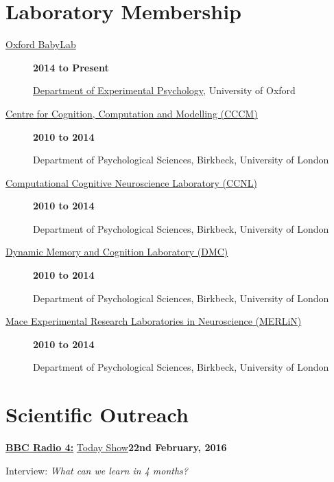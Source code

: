 \section{Laboratory Membership}
\begin{description}

\item[\href{http://www.psy.ox.ac.uk/research/oxford-babylab}{Oxford BabyLab}]
      \hfill \textbf{2014 to Present}\blankline

\href{http://www.psy.ox.ac.uk/}{Department of Experimental Psychology}, University of Oxford

\item[\href{http://cccm.bbk.ac.uk/}{Centre for Cognition, Computation and Modelling (CCCM)}] 
\blankline

\hfill \textbf{2010 to 2014}\blankline

Department of Psychological Sciences, Birkbeck, University of London
 \item[\href{http://www.ccnl.bbk.ac.uk/}{Computational Cognitive Neuroscience Laboratory (CCNL)}]    
 \blankline
 
 \hfill \textbf{2010 to 2014} \blankline

Department of Psychological Sciences, Birkbeck, University of London
 \item[\href{http://www.bbk.ac.uk/psychology/dmclab/}{Dynamic Memory and Cognition Laboratory (DMC)}]     
 \blankline
 
 \hfill \textbf{2010 to 2014} \blankline

Department of Psychological Sciences, Birkbeck, University of London
 \item[\href{http://www.bbk.ac.uk/psychology/merlin/}{Mace Experimental Research Laboratories in Neuroscience (MERLiN)}]     
 \blankline
 
 \hfill \textbf{2010 to 2014} \blankline

Department of Psychological Sciences, Birkbeck, University of London

\end{description}


\section{Scientific Outreach}
\href{http://www.bbc.co.uk/radio4}{\textbf{BBC Radio 4:}} \href{http://www.bbc.co.uk/programmes/b0713zdz}{Today Show}\hfill\textbf{22nd February, 2016}


\begin{outerlist}

\item [] Interview: \textit{What can we learn in 4 months?}

\end{outerlist}

